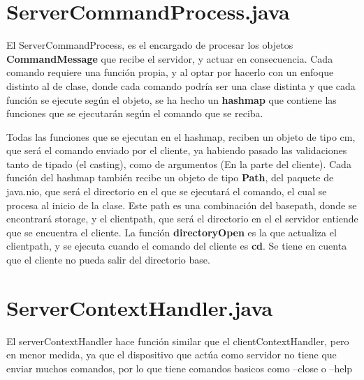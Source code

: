 \documentclass[a4paper, 12pt]{report}
\begin{document}
    \section{ServerCommandProcess.java}

    El ServerCommandProcess, es el encargado de procesar los objetos \textbf{CommandMessage} que recibe el
    servidor, y actuar en consecuencia. Cada comando requiere una función propia, y al optar
    por hacerlo con un enfoque distinto al de clase, donde cada comando podría ser una clase distinta y que cada
    función se ejecute según el objeto, se ha hecho un \textbf{hashmap} que contiene las funciones que se ejecutarán
    según el comando que se reciba.

    Todas las funciones que se ejecutan en el hashmap, reciben un objeto de tipo cm,
    que será el comando enviado por el cliente, ya habiendo pasado las validaciones tanto de tipado (el casting),
    como de argumentos (En la parte del cliente). Cada función del hashmap también recibe un objeto de tipo
    \textbf{Path}, del paquete de java.nio, que será el directorio en el que se ejecutará el comando, el cual se
    procesa al inicio de la clase. Este path es una combinación del basepath, donde se encontrará storage, y el
    clientpath, que será el directorio en el el servidor entiende que se encuentra el cliente. La función
    \textbf{directoryOpen} es la que actualiza el clientpath, y se ejecuta cuando el comando del cliente es
    \textbf{cd}. Se tiene en cuenta que el cliente no pueda salir del directorio base.

    \section{ServerContextHandler.java}

    El serverContextHandler hace función similar que el clientContextHandler, pero en menor medida, ya que el
    dispositivo que actúa como servidor no tiene que enviar muchos comandos, por lo que tiene comandos basicos como
    --close o --help
\end{document}

